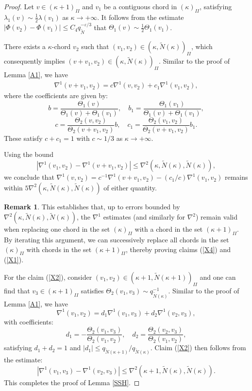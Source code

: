 \documentclass{amsart}
\theoremstyle{definition}
\newtheorem{Remark}[Definition]{Remark}
\begin{document}
\begin{proof}
Let $v \in (\kappa+1)_{II}$ and $v_1$ be a contiguous chord in $(\kappa)_{II}$, satisfying $\lambda_1(v) \sim \frac{1}{2}\lambda(v_1)$ as $\kappa\to+\infty$. It follows from the estimate $|\Phi(v_2)-\Phi(v_1)| \leq C_4 q_{\tilde{N}}^{-\varepsilon/3}$ that $\Theta_1(v) \sim \frac{1}{2}\Theta_1(v_1)$.


{There exists  a $\kappa$-chord  $v_2$ such that $(v_1,v_2) \in (\kappa,\tilde{N}(\kappa))_{II}$, which consequently implies $(v+v_1,v_2) \in (\kappa,\tilde{N}(\kappa))_{II}$.} Similar to the proof of Lemma \ref{A1}, we have
\begin{align}
	\nabla^1(v+v_1,v_2) = c\nabla^1(v,v_2) + c_1\nabla^1(v_1,v_2),
\end{align}
where the coefficients are given by:
\[
b =\frac{\Theta_1(v)}{\Theta_1(v)+\Theta_1(v_1)},\quad b_1 = \frac{\Theta_1(v_1)}{\Theta_1(v)+\Theta_1(v_1)}, \]
\[ c = \frac{\Theta_2(v,v_2)}{\Theta_2(v+v_1,v_2)}b, \quad c_1 = \frac{\Theta_2(v_1,v_2)}{\Theta_2(v+v_1,v_2)}b_1.
\]
These satisfy $c + c_1 = 1$ with $c \sim 1/3$ as $\kappa\to+\infty$.

Using the bound
\[
|\nabla^1(v_1,v_2) - \nabla^1(v+v_1,v_2)| \leq \nabla^2(\kappa,\tilde{N}(\kappa),\tilde{N}(\kappa)),
\]
we conclude that $\nabla^1(v,v_2) = c^{-1}\nabla^1(v+v_1,v_2) - (c_1/c)\nabla^1(v_1,v_2)$ remains within $5\nabla^2(\kappa,\tilde{N}(\kappa),\tilde{N}(\kappa))$ of either quantity.

\begin{Remark}
	This establishes that, up to errors bounded by $\nabla^2(\kappa,\tilde{N}(\kappa),\tilde{N}(\kappa))$, the $\nabla^1$ estimates (and similarly for $\nabla^2$) remain valid when replacing one chord in the set $(\kappa)_{II}$  with a chord in the set $(\kappa+1)_{II}$. By iterating this argument, we can successively replace all chords in the set $(\kappa)_{II}$ with chords in the set $(\kappa+1)_{II}$, thereby proving claims (\ref{X4}) and (\ref{X1}).
\end{Remark}

For the claim (\ref{X2}), consider $(v_1,v_2) \in (\kappa+1,\tilde{N}(\kappa+1))_{II}$ and one can find that $v_3 \in (\kappa+1)_{II}$ satisfies $\Theta_2(v_1,v_3) \sim q_{\tilde{N}(\kappa)}^{-1}$. Similar to the proof of Lemma \ref{A1}, we have
\[
\nabla^1(v_1,v_2) = d_1\nabla^1(v_1,v_3) + d_2\nabla^1(v_2,v_3),
\]
with coefficients:
\[
d_1 = -\frac{\Theta_2(v_1,v_3)}{\Theta_2(v_1,v_2)}, \quad d_2 = \frac{\Theta_2(v_2,v_3)}{\Theta_2(v_1,v_2)},
\]
satisfying $d_1 + d_2 = 1$ and $|d_1| \leq q_{\tilde{N}(\kappa+1)}/q_{\tilde{N}(\kappa)}$. Claim (\ref{X2}) then follows from the estimate:
\[
|\nabla^1(v_1,v_3) - \nabla^1(v_2,v_3)| \leq \nabla^2(\kappa+1,\tilde{N}(\kappa),\tilde{N}(\kappa)).
\]
This completes the proof of Lemma \ref{SSH}.		
\end{proof}
\end{document}
